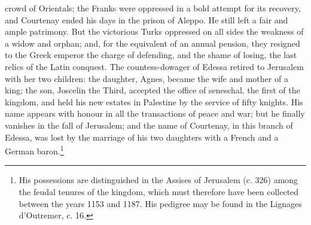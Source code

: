 crowd of Orientals; the Franks were oppressed in a bold attempt for its recovery, and Courtenay ended his days in the prison of Aleppo. He still left a fair and ample patrimony. But the victorious Turks oppressed on all sides the weakness of a widow and orphan; and, for the equivalent of an annual pension, they resigned to the Greek emperor the charge of defending, and the shame of losing, the last relics of the Latin conquest. The countess-dowager of Edessa retired to Jerusalem with her two children: the daughter, Agnes, became the wife and mother of a king; the son, Joscelin the Third, accepted the office of seneschal, the first of the kingdom, and held his new estates in Palestine by the service of fifty knights. His name appears with honour in all the transactions of peace and war; but he finally vanishes in the fall of Jerusalem; and the name of Courtenay, in this branch of Edessa, was lost by the marriage of his two daughters with a French and a German baron.\footnote{His possessions are distinguished in the Assises of Jerusalem (c. 326) among the feudal tenures of the kingdom, which must therefore have been collected between the years 1153 and 1187. His pedigree may be found in the Lignages d\texthebrew{}’Outremer, c. 16.}

